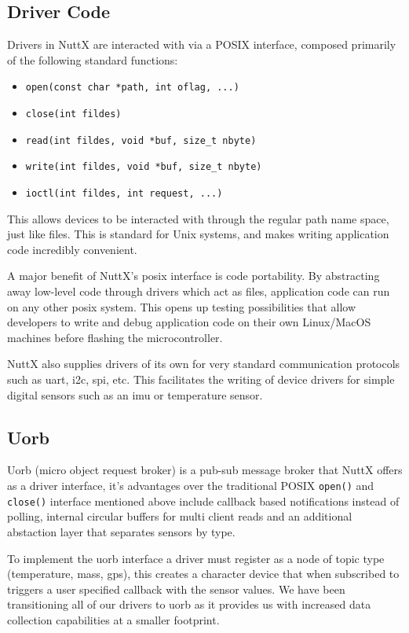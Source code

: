 \subsection{Driver Code}

Drivers in NuttX are interacted with via a POSIX interface, composed primarily of the following standard functions:

\begin{itemize}
    \item \texttt{open(const char *path, int oflag, ...)}
    \item \texttt{close(int fildes)}
    \item \texttt{read(int fildes, void *buf, size\_t nbyte)}
    \item \texttt{write(int fildes, void *buf, size\_t nbyte)}
    \item \texttt{ioctl(int fildes, int request, ...)}
\end{itemize}

This allows devices to be interacted with through the regular path name space, just like files. This is standard for
Unix systems, and makes writing application code incredibly convenient.

A major benefit of NuttX's \gls{posix} interface is code portability. By abstracting away low-level code through
drivers which act as files, application code can run on any other \gls{posix} system. This opens up testing
possibilities that allow developers to write and debug application code on their own Linux/MacOS machines before
flashing the microcontroller.

NuttX also supplies drivers of its own for very standard communication protocols such as \gls{uart}, \gls{i2c},
\gls{spi}, etc. This facilitates the writing of device drivers for simple digital sensors such as an \gls{imu} or
temperature sensor.

\subsection{Uorb \cite{uorb-driver}}

Uorb (micro object request broker) is a pub-sub message broker that NuttX offers as a driver interface, it's advantages over the traditional POSIX \texttt{open()} and \texttt{close()} interface mentioned above
include callback based notifications instead of polling, internal circular buffers for multi client reads and an additional abstaction layer that separates sensors by type.

To implement the uorb interface a driver must register as a node of topic type (temperature, mass, gps), this creates a character device that when subscribed to triggers a user specified callback with the sensor values.
We have been transitioning all of our drivers to uorb as it provides us with increased data collection capabilities at a smaller footprint.

